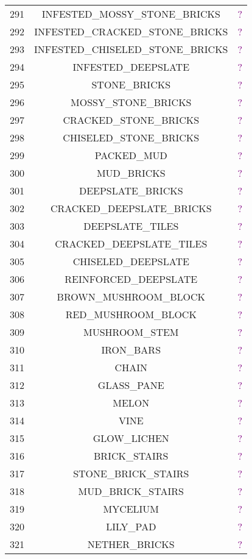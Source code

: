 \documentclass[11pt]{article}
\newcommand\myworries[1]{\textcolor{purple}{#1}}
\begin{document}
\begin{longtable}{ |c|c|c| }
	291 & INFESTED\_MOSSY\_STONE\_BRICKS & \myworries{?} \\
	292 & INFESTED\_CRACKED\_STONE\_BRICKS & \myworries{?} \\
	293 & INFESTED\_CHISELED\_STONE\_BRICKS & \myworries{?} \\
	294 & INFESTED\_DEEPSLATE & \myworries{?} \\
	295 & STONE\_BRICKS & \myworries{?} \\
	296 & MOSSY\_STONE\_BRICKS & \myworries{?} \\
	297 & CRACKED\_STONE\_BRICKS & \myworries{?} \\
	298 & CHISELED\_STONE\_BRICKS & \myworries{?} \\
	299 & PACKED\_MUD & \myworries{?} \\
	300 & MUD\_BRICKS & \myworries{?} \\
	301 & DEEPSLATE\_BRICKS & \myworries{?} \\
	302 & CRACKED\_DEEPSLATE\_BRICKS & \myworries{?} \\
	303 & DEEPSLATE\_TILES & \myworries{?} \\
	304 & CRACKED\_DEEPSLATE\_TILES & \myworries{?} \\
	305 & CHISELED\_DEEPSLATE & \myworries{?} \\
	306 & REINFORCED\_DEEPSLATE & \myworries{?} \\
	307 & BROWN\_MUSHROOM\_BLOCK & \myworries{?} \\
	308 & RED\_MUSHROOM\_BLOCK & \myworries{?} \\
	309 & MUSHROOM\_STEM & \myworries{?} \\
	310 & IRON\_BARS & \myworries{?} \\
	311 & CHAIN & \myworries{?} \\
	312 & GLASS\_PANE & \myworries{?} \\
	313 & MELON & \myworries{?} \\
	314 & VINE & \myworries{?} \\
	315 & GLOW\_LICHEN & \myworries{?} \\
	316 & BRICK\_STAIRS & \myworries{?} \\
	317 & STONE\_BRICK\_STAIRS & \myworries{?} \\
	318 & MUD\_BRICK\_STAIRS & \myworries{?} \\
	319 & MYCELIUM & \myworries{?} \\
	320 & LILY\_PAD & \myworries{?} \\
	321 & NETHER\_BRICKS & \myworries{?} \\

\end{longtable}
\end{document}

